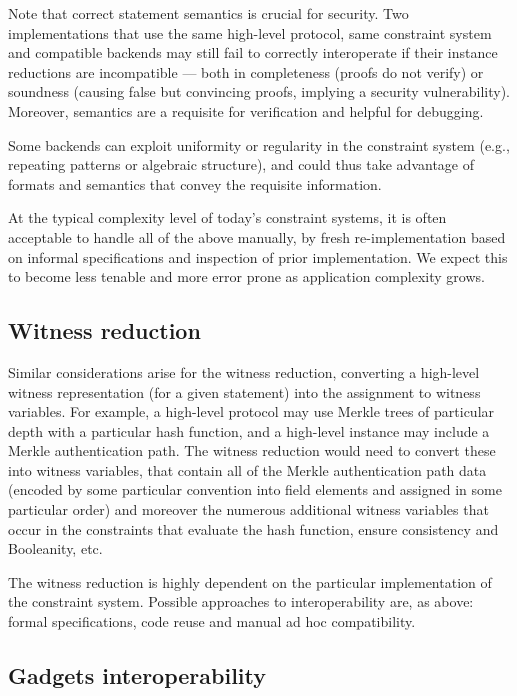 Note that correct statement semantics is crucial for security.
Two implementations that use the same high-level protocol, same constraint system and compatible backends may still fail to correctly interoperate if their instance reductions are incompatible --- both in completeness (proofs do not verify) or soundness (causing false but convincing proofs, implying a security vulnerability). Moreover, semantics are a requisite for verification and helpful for debugging.

Some backends can exploit uniformity or regularity in the constraint system (e.g., repeating patterns or algebraic structure), and could thus take advantage of formats and semantics that convey the requisite information.

At the typical complexity level of today's constraint systems, it is often acceptable to handle all of the above manually, by fresh re-implementation based on informal specifications and inspection of prior implementation.
We expect this to become less tenable and more error prone as application complexity grows.


\subsection{Witness reduction}
\label{implem:interoperability:witness-reduction}

Similar considerations arise for the witness reduction, converting a high-level witness representation (for a given statement) into the assignment to witness variables.
For example, a high-level protocol may use Merkle trees of particular depth with a particular hash function, and a high-level instance may include a Merkle authentication path.
The witness reduction would need to convert these into witness variables, that contain all of the Merkle authentication path data (encoded by some particular convention into field elements and assigned in some particular order) and moreover the numerous additional witness variables that occur in the constraints that evaluate the hash function, ensure consistency and Booleanity, etc.

The witness reduction is highly dependent on the particular implementation of the constraint system.
Possible approaches to interoperability are, as above: formal specifications, code reuse and manual ad hoc compatibility.


\subsection{Gadgets interoperability}
\label{implem:interoperability:gadgets}

